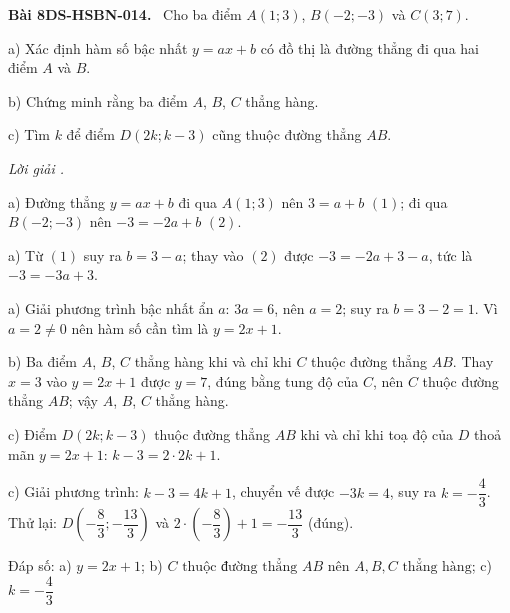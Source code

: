 \documentclass[12pt,a4paper]{article}
\newenvironment{problem}[1][]{\par\medskip\noindent\textbf{Bài #1.}\ }{\par}
\newenvironment{solution}[1][]{\par\noindent\textit{Lời giải #1.}\par}{\par}
\begin{document}
\begin{problem}[8DS-HSBN-014]
Cho ba điểm $A(1; 3)$, $B(-2; -3)$ và $C(3; 7)$.

a) Xác định hàm số bậc nhất $y = ax + b$ có đồ thị là đường thẳng đi qua hai điểm $A$ và $B$.

b) Chứng minh rằng ba điểm $A$, $B$, $C$ thẳng hàng.

c) Tìm $k$ để điểm $D(2k; k - 3)$ cũng thuộc đường thẳng $AB$.

\begin{solution}
a) Đường thẳng $y = ax + b$ đi qua $A(1; 3)$ nên $3 = a + b$ $(1)$; đi qua $B(-2; -3)$ nên $-3 = -2a + b$ $(2)$.

a) Từ $(1)$ suy ra $b = 3 - a$; thay vào $(2)$ được $-3 = -2a + 3 - a$, tức là $-3 = -3a + 3$.

a) Giải phương trình bậc nhất ẩn $a$: $3a = 6$, nên $a = 2$; suy ra $b = 3 - 2 = 1$. Vì $a = 2 \neq 0$ nên hàm số cần tìm là $y = 2x + 1$.

b) Ba điểm $A$, $B$, $C$ thẳng hàng khi và chỉ khi $C$ thuộc đường thẳng $AB$. Thay $x = 3$ vào $y = 2x + 1$ được $y = 7$, đúng bằng tung độ của $C$, nên $C$ thuộc đường thẳng $AB$; vậy $A$, $B$, $C$ thẳng hàng.

c) Điểm $D(2k; k - 3)$ thuộc đường thẳng $AB$ khi và chỉ khi toạ độ của $D$ thoả mãn $y = 2x + 1$: $k - 3 = 2 \cdot 2k + 1$.

c) Giải phương trình: $k - 3 = 4k + 1$, chuyển vế được $-3k = 4$, suy ra $k = -\dfrac{4}{3}$. Thử lại: $D\left(-\dfrac{8}{3}; -\dfrac{13}{3}\right)$ và $2 \cdot \left(-\dfrac{8}{3}\right) + 1 = -\dfrac{13}{3}$ (đúng).

Đáp số: a) $\boxed{y = 2x + 1}$; b) $\boxed{C \text{ thuộc đường thẳng } AB \text{ nên } A, B, C \text{ thẳng hàng}}$; c) $\boxed{k = -\dfrac{4}{3}}$
\end{solution}
\end{problem}
\end{document}
